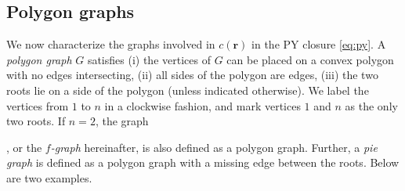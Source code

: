 \documentclass[preprint]{revtex4-1}
\newcommand{\vct}[1]{\mathbf{#1}}
\providecommand{\vr}{} %
\renewcommand{\vr}{\vct{r}}
\begin{document}
\subsection{Polygon graphs}



We now characterize the graphs involved in $c(\vr)$
  in the PY closure \eqref{eq:py}.
%
A \emph{polygon graph} $G$ satisfies
  (i) the vertices of $G$ can be placed
  on a convex polygon
  with no edges intersecting,
  (ii) all sides of the polygon are edges,
  (iii) the two roots lie on a side of the polygon (unless indicated otherwise).
%
We label the vertices from $1$ to $n$ in a clockwise fashion,
  and mark vertices $1$ and $n$ as the only two roots.
%
If $n = 2$, the graph
  ,
  or the \emph{$f$-graph} hereinafter,
  is also defined as a polygon graph.
%
Further,
  a \emph{pie graph}
  is defined as
  a polygon graph with a missing edge between the roots.
%
Below are two examples.
%
\end{document}
